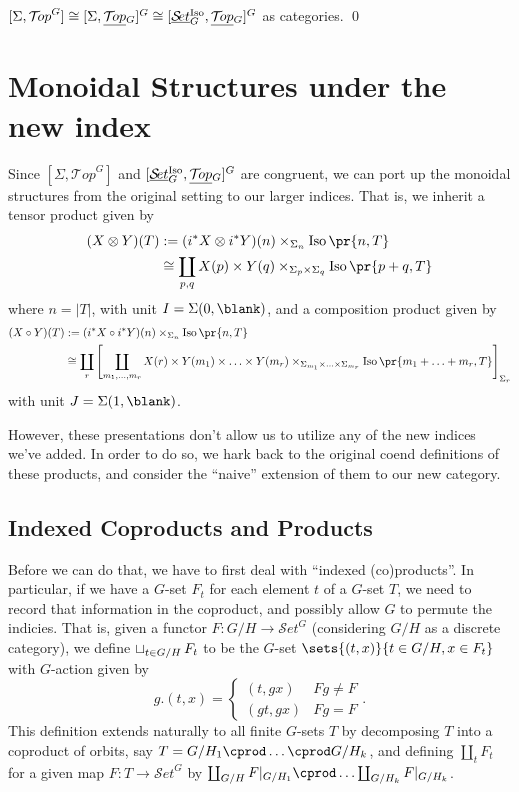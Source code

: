 \documentclass{report}
\newcommand{\Top}{\text{$\mathcal{T}\!op$}}
\newcommand{\Set}{\text{$\mathcal{S}\!et$}}
\DeclareMathOperator{\Iso}{Iso}
\newcommand{\iso}[1]{\text{$\Iso\pr{#1}$}}
\newcommand{\TopG}{\text{\underline{$\Top$}$_G$}}
\newcommand{\SetG}{\text{\underline{$\Set$}$_G^{\mbox{\scriptsize Iso}}$}}
\renewcommand{\ST}{\text{$[\SetG,\TopG]^G$}}
\newcommand{\ico}{\operatornamewithlimits{\sqcup}}
\begin{document}
\begin{cor}
  $[\Sigma,\Top^G]\cong[\Sigma,\TopG]^G\cong\ST$ as categories. \qed
\end{cor}


\section{Monoidal Structures under the new index}
Since $[\Sigma,\Top^G]$ and $\ST$ are congruent, we can port up the monoidal structures from the original setting to our larger indices. That is, we inherit a tensor product given by
\begin{align*}
  (X\otimes Y)(T) &:= (i^*X\otimes i^*Y)(n)\times_{\Sigma_n}\iso{n,T}\\
  &\cong \coprod_{p,q}X(p)\times Y(q)\times_{\Sigma_p\times \Sigma_q}\iso{p+q,T}
\end{align*}
where $n = |T|$, with unit $I = \Sigma(0,\blank)$, 
and a composition product given by
\begin{align*}
  (X\circ Y)(T) &:= (i^*X\circ i^*Y)(n)\times_{\Sigma_n}\iso{n,T}\\
  &\cong \coprod_r\left[\coprod_{m_1,\ldots,m_r}X(r)\times Y(m_1)\times\ldots\times Y(m_r)\times_{\Sigma_{m_1}\times\ldots\times\Sigma_{m_r}}\iso{m_1+\ldots+m_r,T}\right]_{\Sigma_r}
\end{align*}
with unit $J = \Sigma(1,\blank)$.

However, these presentations don't allow us to utilize any of the new indices we've added. In order to do so, we hark back to the original coend definitions of these products, and consider the ``naive'' extension of them to our new category. 


\subsection{Indexed Coproducts and Products}
Before we can do that, we have to first deal with ``indexed (co)products''. In particular, if we have a $G$-set $F_t$ for each element $t$ of a $G$-set $T$, we need to record that information in the coproduct, and possibly allow $G$ to permute the indicies. That is, given a functor $F: G/H\to \Set^G$ (considering $G/H$ as a discrete category), we define $\ico_{t\in G/H}F_t$ to be the $G$-set $\sets{(t,x)}{t\in G/H, x\in F_t}$ with $G$-action given by 
\[g.(t,x) = \left\{\begin{array}{lr}(t,gx) & Fg\neq F\\ (gt,gx) & Fg = F\end{array}\right. .\]
This definition extends naturally to all finite $G$-sets $T$ by decomposing $T$ into a coproduct of orbits, say $T = G/H_1\cprod\ldots\cprod G/H_k$, and defining $\coprod_tF_t$ for a given map $F: T\to \Set^G$ by $\coprod_{G/H}F|_{G/H_1}\cprod \ldots \coprod_{G/H_k}F|_{G/H_k}$. 
\end{document}
